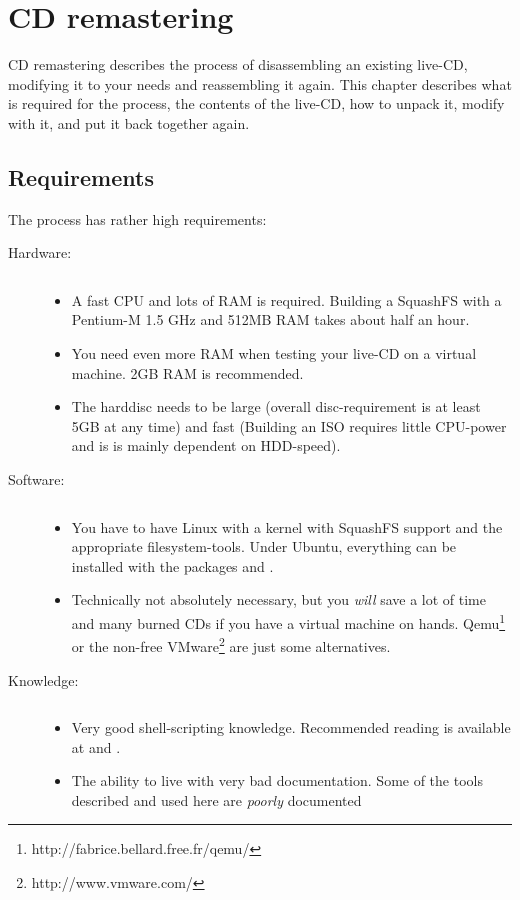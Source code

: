
\chapter{CD remastering}\label{chapter:CD remastering}
CD remastering describes the process of disassembling an existing live-CD,
modifying it to your needs and reassembling it again. This chapter describes
what is required for the process, the contents of the live-CD, how to unpack it,
modify with it, and put it back together again.

\section{Requirements}
The process has rather high requirements:
\begin{description}
 \item[Hardware:] $\qquad$
   \begin{itemize}
    \item A fast CPU and lots of RAM is required. Building a SquashFS with a
      Pentium-M 1.5 GHz and 512MB RAM takes about half an hour.
    \item You need even more RAM when testing your live-CD on a virtual
      machine. 2GB RAM is recommended.
    \item The harddisc needs to be large (overall disc-requirement is at least
      5GB at any time) and fast (Building an ISO requires little CPU-power and
      is is mainly dependent on HDD-speed).
   \end{itemize}
 \item[Software:] $\qquad$
   \begin{itemize}
     \item You have to have Linux with a kernel with SquashFS support and the
       appropriate filesystem-tools. Under Ubuntu, everything can be installed
       with the packages  and .
     \item Technically not absolutely necessary, but you \emph{will} save a lot
       of time and many burned CDs if you have a virtual machine on hands.
       Qemu\footnote{http://fabrice.bellard.free.fr/qemu/} or the non-free
       VMware\footnote{http://www.vmware.com/} are just some alternatives.
   \end{itemize}
 \item[Knowledge:] $\qquad$
   \begin{itemize}
     \item Very good shell-scripting knowledge. Recommended reading is available at
     	\cite{bash-intro} and \cite{bash-advanced}.
     \item The ability to live with very bad documentation. Some of the tools
       described and used here are \emph{poorly} documented
   \end{itemize}
\end{description}

